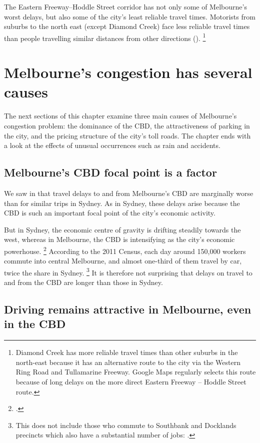 \documentclass{grattan}
\begin{document}
The Eastern Freeway--Hoddle Street corridor has not only some of Melbourne's worst delays, but also some of the city's least reliable travel times. Motorists from suburbs to the north east (except Diamond Creek) face less reliable travel times than people travelling similar distances from other directions ().%
    \footnote{Diamond Creek has more reliable travel times than other suburbs in the north-east because it has an alternative route to the city via the Western Ring Road and Tullamarine Freeway.
Google Maps regularly selects this route because of long delays on the more direct Eastern Freeway -- Hoddle Street route.}

\section{Melbourne's congestion has several causes}%

The next sections of this chapter examine three main causes of Melbourne's congestion problem: the dominance of the CBD, the attractiveness of parking in the city, and the pricing structure of the city's toll roads.
The chapter ends with a look at the effects of unusual occurrences such as rain and accidents.

\subsection{Melbourne's CBD focal point is a factor}

We saw in  that travel delays to and from Melbourne’s CBD are marginally worse than for similar trips in Sydney.
As in Sydney, these delays arise because the CBD is such an important focal point of the city's economic activity.

But in Sydney, the economic centre of gravity is drifting steadily towards the west, whereas in Melbourne, the CBD is intensifying as the city's economic powerhouse.%
\footcite{2016-Rasmussen-changing-business-location}
According to the 2011 Census, each day around 150,000 workers commute into central Melbourne, and 
almost one-third of them travel by car, twice the share in Sydney.%
	\footnote{This does not include those who commute to Southbank and Docklands precincts which also have a substantial number of jobs: \textcite{ABS2011Census}.}
It is therefore not surprising that delays on travel to and from the CBD are longer than those in Sydney.


\subsection{Driving remains attractive in Melbourne, even in the CBD}
\end{document}
